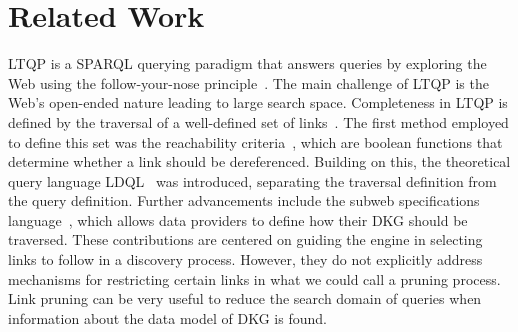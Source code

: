 \section{Related Work}


LTQP is a SPARQL querying paradigm that answers queries by exploring the Web using the follow-your-nose principle~\cite{hartig2016walking}.
The main challenge of LTQP is the Web's open-ended nature leading to large search space.
Completeness in LTQP is defined by the traversal of a well-defined set of links~\cite{Hartig2012}.
The first method employed to define this set was the reachability criteria~\cite{Hartig2012}, which are boolean functions that determine whether a link should be dereferenced.
Building on this, the theoretical query language LDQL~\cite{hartigLDQL} was introduced, separating the traversal definition from the query definition.
Further advancements include the subweb specifications language~\cite{Bogaerts2021LinkTW}, which allows data providers to define how their DKG should be traversed.
These contributions are centered on guiding the engine in selecting links to follow in a discovery process.
However, they do not explicitly address mechanisms for restricting certain links in what we could call a pruning process.
Link pruning can be very useful to reduce the search domain of queries when information about the data model of DKG is found.

